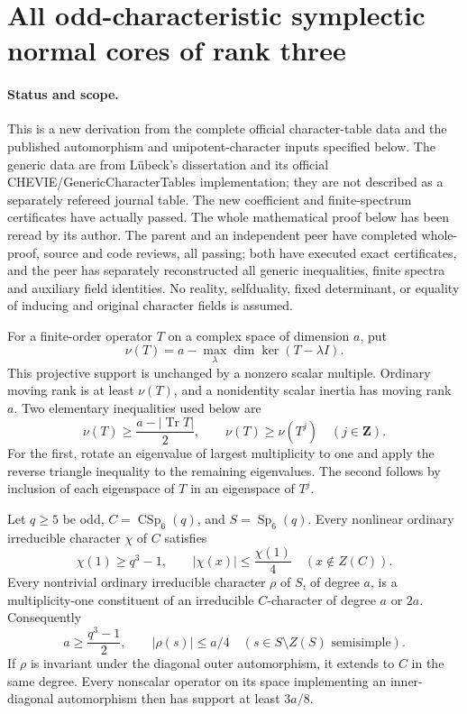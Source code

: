 \section{All odd-characteristic symplectic normal cores of rank three}
\label{sec:odd-c3-core}

\paragraph{Status and scope.}
This is a new derivation from the complete official character-table
data and the published automorphism and unipotent-character inputs
specified below. The generic data are from L\"ubeck's dissertation and
its official CHEVIE/GenericCharacterTables implementation; they are
not described as a separately refereed journal table. The new
coefficient and finite-spectrum certificates have actually passed.
The whole mathematical proof below has been reread by its author.
The parent and an independent peer have completed whole-proof,
source and code reviews, all passing; both have executed exact
certificates, and the peer has separately reconstructed all
generic inequalities, finite spectra and auxiliary field identities.
No reality, selfduality,
fixed determinant, or equality of inducing and original character
fields is assumed.

For a finite-order operator $T$ on a complex space of dimension $a$,
put
\[
 \nu(T)=a-\max_{\lambda}\dim\ker(T-\lambda I).
                                                               \tag{C3.1}
\]
This projective support is unchanged by a nonzero scalar multiple.
Ordinary moving rank is at least $\nu(T)$, and a nonidentity scalar
inertia has moving rank $a$. Two elementary inequalities used below
are
\[
 \nu(T)\ge\frac{a-|\operatorname{Tr}T|}{2},\qquad
 \nu(T)\ge\nu(T^j)\quad(j\in\mathbf Z).
                                                               \tag{C3.2}
\]
For the first, rotate an eigenvalue of largest multiplicity to one
and apply the reverse triangle inequality to the remaining
eigenvalues. The second follows by inclusion of each eigenspace of
$T$ in an eigenspace of $T^j$.

\begin{lemma}
\label{D-C3-01}
Let $q\ge5$ be odd, $C=\operatorname{CSp}_6(q)$, and
$S=\operatorname{Sp}_6(q)$. Every nonlinear ordinary irreducible
character $\chi$ of $C$ satisfies
\[
 \chi(1)\ge q^3-1,\qquad
 |\chi(x)|\le\frac{\chi(1)}4\quad(x\notin Z(C)).
                                                               \tag{C3.3}
\]
Every nontrivial ordinary irreducible character $\rho$ of $S$,
of degree $a$, is a multiplicity-one constituent of an irreducible
$C$-character of degree $a$ or $2a$. Consequently
\[
 a\ge\frac{q^3-1}{2},\qquad
 |\rho(s)|\le a/4
 \quad(s\in S\setminus Z(S)\text{ semisimple}).
                                                               \tag{C3.4}
\]
If $\rho$ is invariant under the diagonal outer automorphism, it
extends to $C$ in the same degree. Every nonscalar operator on its
space implementing an inner-diagonal automorphism then has support
at least $3a/8$.
\end{lemma}

